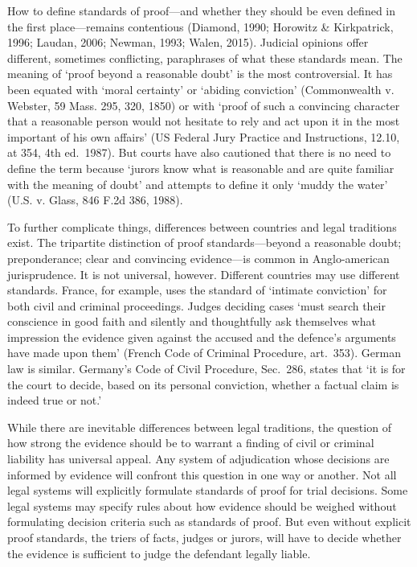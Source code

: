 \documentclass[10pt,dvipsnames,enabledeprecatedfontcommands]{scrartcl}
\begin{document}
How to define standards of proof---and whether they should be even
defined in the first place---remains contentious (Diamond, 1990;
Horowitz \& Kirkpatrick, 1996; Laudan, 2006; Newman, 1993; Walen, 2015).
Judicial opinions offer different, sometimes conflicting, paraphrases of
what these standards mean. The meaning of `proof beyond a reasonable
doubt' is the most controversial. It has been equated with `moral
certainty' or `abiding conviction' (Commonwealth v. Webster, 59 Mass.
295, 320, 1850) or with `proof of such a convincing character that a
reasonable person would not hesitate to rely and act upon it in the most
important of his own affairs' (US Federal Jury Practice and
Instructions, 12.10, at 354, 4th ed.~1987). But courts have also
cautioned that there is no need to define the term because `jurors know
what is reasonable and are quite familiar with the meaning of doubt' and
attempts to define it only `muddy the water' (U.S. v. Glass, 846 F.2d
386, 1988).

To further complicate things, differences between countries and legal
traditions exist. The tripartite distinction of proof standards---beyond
a reasonable doubt; preponderance; clear and convincing evidence---is
common in Anglo-american jurisprudence. It is not universal, however.
Different countries may use different standards. France, for example,
uses the standard of `intimate conviction' for both civil and criminal
proceedings. Judges deciding cases `must search their conscience in good
faith and silently and thoughtfully ask themselves what impression the
evidence given against the accused and the defence's arguments have made
upon them' (French Code of Criminal Procedure, art.~353). German law is
similar. Germany's Code of Civil Procedure, Sec.~286, states that `it is
for the court to decide, based on its personal conviction, whether a
factual claim is indeed true or
not.'

While there are inevitable differences between legal traditions, the
question of how strong the evidence should be to warrant a finding of
civil or criminal liability has universal appeal. Any system of
adjudication whose decisions are informed by evidence will confront this
question in one way or another. Not all legal systems will explicitly
formulate standards of proof for trial decisions. Some legal systems may
specify rules about how evidence should be weighed without formulating
decision criteria such as standards of proof. But even without explicit
proof standards, the triers of facts, judges or jurors, will have to
decide whether the evidence is sufficient to judge the defendant legally
liable.
\end{document}
